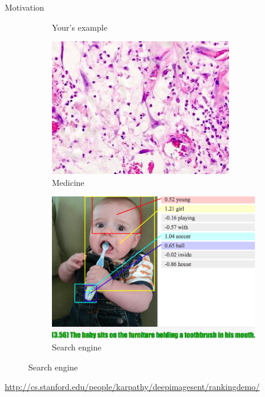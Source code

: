 \documentclass{beamer}
\begin{document}
\begin{frame}{Motivation}
\begin{itemize}
\begin{figure}[htbp]
\begin{subfigure}[b]{0.25\textwidth}
				\caption{Your's example}
			\end{subfigure}
			 \begin{subfigure}[b]{0.25\textwidth}
				\includegraphics[width=\textwidth]{img/mic}
				\caption{Medicine}
			\end{subfigure}
			 \begin{subfigure}[b]{0.25\textwidth}
				\includegraphics[width=\textwidth]{img/baby}
				\caption{Search engine}
			\end{subfigure}

		\end{figure}
			
			 \href{http://cs.stanford.edu/people/karpathy/deepimagesent/rankingdemo/}{http://cs.stanford.edu/people/karpathy/deepimagesent/rankingdemo/}
	\end{itemize}

\end{frame}
\end{document}
